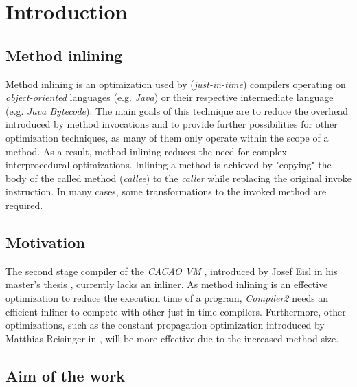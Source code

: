 \documentclass[draft, final]{vutinfth} %
\begin{document}

\tableofcontents %

\mainmatter

\chapter{Introduction}

\section{Method inlining}

Method inlining is an optimization used by (\emph{just-in-time}) compilers operating on \emph{object-oriented} languages (e.g. \emph{Java}) or their respective intermediate language (e.g. \emph{Java Bytecode}). The main goals of this technique are to reduce the overhead introduced by method invocations and to provide further possibilities for other optimization techniques, as many of them only operate within the scope of a method.  As a result, method inlining reduces the need for complex interprocedural optimizations. Inlining a method is achieved by "copying" the body of the called method (\emph{callee}) to the \emph{caller} while replacing the original invoke instruction. In many cases, some transformations to the invoked method are required.

\section{Motivation}

The second stage compiler of the \emph{CACAO VM} \cite{Krall}, introduced by Josef Eisl in his master's thesis \cite{Eisl13}, currently lacks an inliner. As method inlining is an effective optimization to reduce the execution time of a program, \emph{Compiler2} needs an efficient inliner to compete with other just-in-time compilers. Furthermore, other optimizations, such as the constant propagation optimization introduced by Matthias Reisinger in \cite{Reisinger14}, will be more effective due to the increased method size.

\section{Aim of the work}
\end{document}
